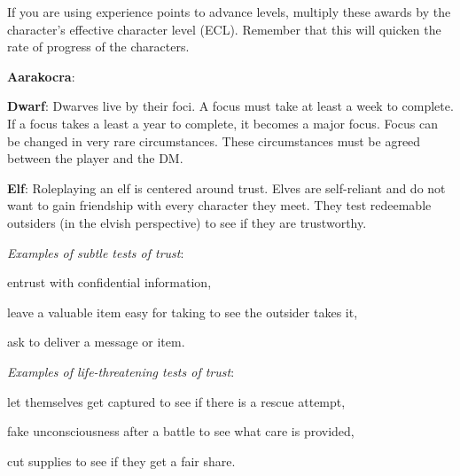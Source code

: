 If you are using experience points to advance levels, multiply these awards by the character's effective character level (ECL). Remember that this will quicken the rate of progress of the characters.

\textbf{Aarakocra}:

\textbf{Dwarf}: Dwarves live by their foci. A focus must take at least a week to complete. If a focus takes a least a year to complete, it becomes a major focus. Focus can be changed in very rare circumstances. These circumstances must be agreed between the player and the DM.


\textbf{Elf}: Roleplaying an elf is centered around trust. Elves are self-reliant and do not want to gain friendship with every character they meet. They test redeemable outsiders (in the elvish perspective) to see if they are trustworthy.

\textit{Examples of subtle tests of trust}:
\begin{itemize*}
	\item entrust with confidential information,
	\item leave a valuable item easy for taking to see the outsider takes it,
	\item ask to deliver a message or item.
\end{itemize*}

\textit{Examples of life-threatening tests of trust}:
\begin{itemize*}
	\item let themselves get captured to see if there is a rescue attempt,
	\item fake unconsciousness after a battle to see what care is provided,
	\item cut supplies to see if they get a fair share.
\end{itemize*}


